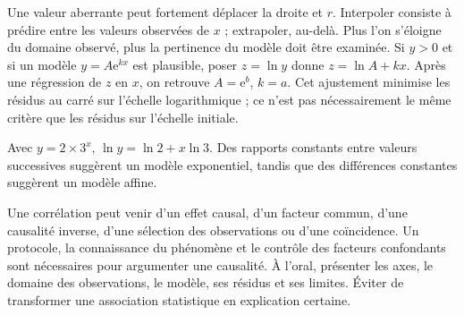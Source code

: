 Une valeur aberrante peut fortement déplacer la droite et $r$.
Interpoler consiste à prédire entre les valeurs observées de $x$ ; extrapoler, au-delà. Plus l'on s'éloigne du domaine observé, plus la pertinence du modèle doit être examinée.
Si $y>0$ et si un modèle $y=A\mathrm e^{kx}$ est plausible, poser $z=\ln y$ donne $z=\ln A+kx$.
Après une régression de $z$ en $x$, on retrouve $A=\mathrm e^b$, $k=a$.
Cet ajustement minimise les résidus au carré sur l'échelle logarithmique ; ce n'est pas nécessairement le même critère que les résidus sur l'échelle initiale.
\begin{exemple}
Avec $y=2\times3^x$, $\ln y=\ln2+x\ln3$. Des rapports constants entre valeurs successives suggèrent un modèle exponentiel, tandis que des différences constantes suggèrent un modèle affine.
\end{exemple}
Une corrélation peut venir d'un effet causal, d'un facteur commun, d'une causalité inverse, d'une sélection des observations ou d'une coïncidence.
Un protocole, la connaissance du phénomène et le contrôle des facteurs confondants sont nécessaires pour argumenter une causalité.
À l'oral, présenter les axes, le domaine des observations, le modèle, ses résidus et ses limites. Éviter de transformer une association statistique en explication certaine.

